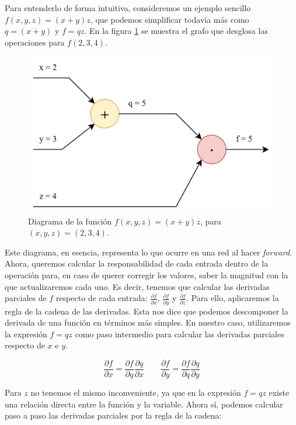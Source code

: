 Para entenderlo de forma intuitiva, consideremos un ejemplo sencillo $f(x,y,z) = (x+y)z$, que podemos simplificar todavía más como $q=(x+y)$ y $f=qz$. En la figura \ref{fig:forward_pass_diagrama} se muestra el grafo que desglosa las operaciones para $f(2,3,4)$.

\begin{figure}[ht]
	\centering
	\includegraphics[width=0.6\linewidth]{figures/ejemplos/forward_diagram.png}
	\caption{Diagrama de la función $f(x,y,z)=(x+y)z$, para $(x,y,z)=(2,3,4)$.}
	\label{fig:forward_pass_diagrama}
\end{figure}

Este diagrama, en esencia, representa lo que ocurre en una red al hacer \textit{forward}. Ahora, queremos calcular la responsabilidad de cada entrada dentro de la operación para, en caso de querer corregir los valores, saber la magnitud con la que actualizaremos cada uno. Es decir, tenemos que calcular las derivadas parciales de $f$ respecto de cada entrada: $\frac{\partial f}{\partial x}$, $\frac{\partial f}{\partial y}$ y $\frac{\partial f}{\partial z}$. Para ello, aplicaremos la regla de la cadena de las derivadas. Esta nos dice que podemos descomponer la derivada de una función en términos más simples. En nuestro caso, utilizaremos la expresión $f=qz$ como paso intermedio para calcular las derivadas parciales respecto de $x$ e $y$.

\begin{equation}
	\frac{\partial f}{\partial x} = \frac{\partial f}{\partial q} \frac{\partial q}{\partial x} \qquad
	\frac{\partial f}{\partial y} = \frac{\partial f}{\partial q} \frac{\partial q}{\partial y}
\end{equation}

Para $z$ no tenemos el mismo inconveniente, ya que en la expresión $f=qz$ existe una relación directa entre la función y la variable. Ahora sí, podemos calcular paso a paso las derivadas parciales por la regla de la cadena:

